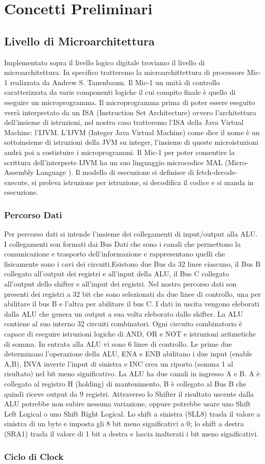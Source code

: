\chapter{Concetti Preliminari}
\section{Livello di Microarchitettura}
Implementato sopra il livello logico digitale troviamo il livello di microarchitettura.
In specifico tratteremo la microarchittettura di processore Mic-1 realizzata da Andrew S. Tanenbaum.
Il Mic-1 un unità di controllo caratterizzata da varie componenti logiche il cui compito finale è quello di eseguire un microprogramma. Il microprogramma prima di poter essere eseguito verrà interpretato da un ISA (Instruction Set Architecture) ovvero l'architettura dell'insieme di istruzioni, nel nostro caso  tratteremo l'ISA della Java Virtual Machine: l'IJVM. L'IJVM (Integer Java Virtual Machine) come dice il nome è un sottoinsieme di istruzioni della JVM su integer, l'insieme di queste microistuzioni andrà poi a costistuire i microprogrammi. Il Mic-1 per poter consentire la scrittura dell'interprete IJVM ha un suo linguaggio microcodice MAL (Micro-Assembly Language ). Il modello di esecuzione si definisce di fetch-decode-execute, si preleva istruzione per istruzione, si decodifica il codice e si manda in esecuzione.
\subsection{Percorso Dati}
Per percorso dati si intende l'insieme dei collegamenti di input/output alla ALU. I collegamenti son formati dai Bus Dati che sono i canali che permettono la comunicazione e trasporto dell'informazione e rappresentano quelli che fisicamente sono i cavi dei circuiti.Esistono due Bus da 32 linee ciascuno, il Bus B collegato all'output dei registri e all'input della ALU, il Bus C collegato all'output dello shifter e all'input dei registri. Nel nostro percorso dati son presenti dei registri a 32 bit che sono selezionati da due linee di controllo, una per abilitare il bus B e l'altra per abilitare il bus C. I dati in uscita vengono eleborati dalla ALU che genera un output a sua volta eleborato dallo shifter. La ALU contiene al suo interno 32 circuiti combinatori. Ogni circuito combinatorio è capace di eseguire istruzioni logiche di AND, OR e NOT e istruzioni aritmetiche di somma. In entrata alla ALU vi sono 6 linee di controllo. Le prime due determinano l'operazione della ALU, ENA e ENB abilitano i due input (enable A,B), INVA inverte l'input di sinistra e INC crea un riporto (somma 1 al risultato) nel bit meno significativo. La ALU ha due canali in ingresso A e B.
A è collegato al registro H (holding) di mantenimento, B è collegato al Bus B che quindi riceve output da 9 registri. Attraverso lo Shifter il risultato uscente dalla ALU potrebbe non subire nessuna variazione, oppure	potrebbe usare uno Shift Left Logical o uno Shift Right Logical. Lo shift a sinistra (SLL8) trasla il valore a sinistra di un byte e imposta gli 8 bit meno significativi a 0; lo shift a destra (SRA1) trasla il valore di 1 bit a destra e lascia inalterati i bit meno significativi.
\subsection{Ciclo di Clock}
		 	
